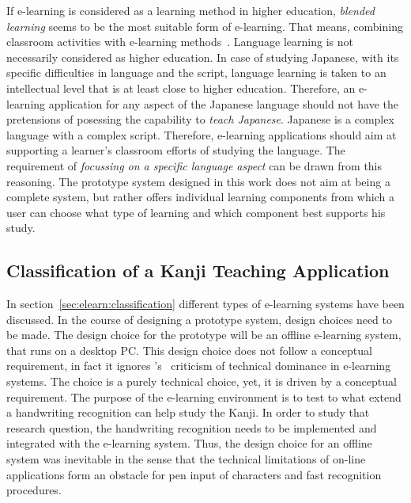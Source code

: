 If e-learning is considered as a learning method in higher education, 
\emph{blended learning} seems to be the most suitable form of e-learning.
That means, combining classroom activities with e-learning 
methods~. Language learning is not 
necessarily considered as higher education. In case of studying Japanese,
with its specific difficulties in language and the script, language learning
is taken to an intellectual level that is at least close to higher education.
Therefore, an e-learning application for any aspect of the Japanese language 
should not have the pretensions of posessing the capability 
to \emph{teach Japanese}. Japanese is a complex language with a complex script.
Therefore, e-learning applications should aim at supporting a learner's 
classroom efforts of studying the language. The requirement of 
\emph{focussing on a specific language aspect} can be drawn from this reasoning.
The prototype system designed in this work does not aim at being a complete
system, but rather offers individual learning components from which a user can 
choose what type of learning and which component best supports his study.

\subsection{Classification of a Kanji Teaching Application}
\label{sec:concept:classificationofakanjiteachingapplication}

In section~\ref{sec:elearn:classification} different types of e-learning systems
have been discussed. In the course of designing a prototype system, 
design choices need to be made.
The design choice for the prototype will be an offline e-learning system,
that runs on a desktop PC.
This design choice does not follow a conceptual requirement, in fact it ignores
's~\citeyear{Ivashin2009} criticism of technical 
dominance in e-learning systems. The choice is a purely technical choice, 
yet, it is driven by a conceptual requirement.
The purpose of the e-learning environment is to test to what extend a handwriting
recognition can help study the Kanji. In order to study that research question,
the handwriting recognition needs to be implemented and integrated with the
e-learning system. Thus, the design choice for an offline system was 
inevitable in the sense that the technical limitations of on-line applications
form an obstacle for pen input of characters and fast recognition procedures.

